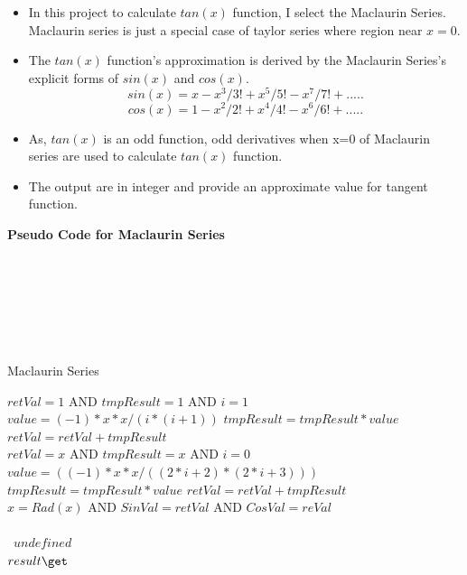\documentclass[a4paper, 11pt]{report}
\begin{document}
\begin{itemize}
\item In this project to calculate $tan(x)$ function, I select the Maclaurin Series.
Maclaurin series is just a special case of
taylor series where region near $x=0$.
\item The $tan(x)$ function's approximation is derived by the Maclaurin Series's explicit forms of $sin(x)$ and $cos(x)$.
\begin{equation} 
sin(x) = x-x^3/3!+x^5/5!-x^7/7!+.....
\end{equation}
\begin{equation} 
cos(x) = 1-x^2/2!+x^4/4!-x^6/6!+.....
\end{equation}
\item As, $tan(x)$ is an odd function, odd derivatives when x=0 of Maclaurin series are used to calculate $tan(x)$ function. \item The output are in integer and provide an approximate value for tangent function.
\end{itemize}

\textbf{Pseudo Code for Maclaurin Series}
\\\\\\\\\\\\\
\begin{algorithm}
\caption{Maclaurin Series} \label{alg:cap}
\begin{algorithmic}
\Require $retVal = 1$ AND $tmpResult = 1$ AND $i=1$
\State $value = (-1)*x*x/(i*(i+1))$
\State $tmpResult = tmpResult * value$
    \EndIf   
    \State $retVal = retVal + tmpResult$ 
\EndFor \\
\EndFunction
\Require $retVal = x$ AND $tmpResult = x$ AND $i=0$
\State $value = ((-1)*x*x/((2*i+2)*(2*i+3)))$
\State $tmpResult = tmpResult * value$
    \EndIf   
    \State $retVal = retVal + tmpResult$ 
\EndFor \\
\EndFunction
\Require $x = Rad(x)$ AND $SinVal = retVal$ AND $CosVal= reVal$
\\\ 
    \EndIf   
{}
\\\    \Return $undefined$
    \EndIf \\      
\EndFunction
\State $result \get $
\end{algorithmic}
\end{algorithm}
\pagebreak
\end{document}
